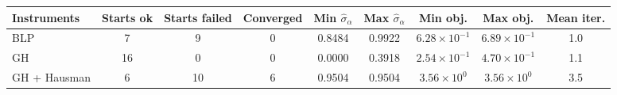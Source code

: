 \begin{tabular}{lcccccccc}
\toprule
Instruments & Starts ok & Starts failed & Converged & Min $\hat\sigma_\alpha$ & Max $\hat\sigma_\alpha$ & Min obj. & Max obj. & Mean iter. \\
\midrule
BLP & 7 & 9 & 0 & 0.8484 & 0.9922 & $6.28\times10^{-1}$ & $6.89\times10^{-1}$ & 1.0 \\
GH & 16 & 0 & 0 & 0.0000 & 0.3918 & $2.54\times10^{-1}$ & $4.70\times10^{-1}$ & 1.1 \\
GH + Hausman & 6 & 10 & 6 & 0.9504 & 0.9504 & $3.56\times10^{0}$ & $3.56\times10^{0}$ & 3.5 \\
\bottomrule
\end{tabular}
